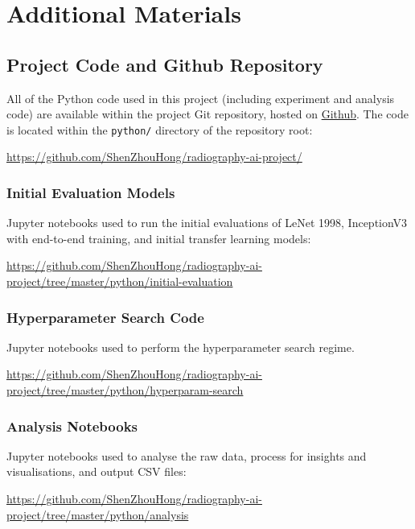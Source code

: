 \setlength{\headwidth}{\textwidth}

\chapter{Additional Materials}

\section{Project Code and Github Repository}

All of the Python code used in this project (including experiment and analysis code) are available within the project Git repository, hosted on \href{https://github.com/}{Github}. The code is located within the \texttt{python/} directory of the repository root:

\url{https://github.com/ShenZhouHong/radiography-ai-project/}

\subsection{Initial Evaluation Models}

Jupyter notebooks used to run the initial evaluations of LeNet 1998, InceptionV3 with end-to-end training, and initial transfer learning models:

\url{https://github.com/ShenZhouHong/radiography-ai-project/tree/master/python/initial-evaluation}

\subsection{Hyperparameter Search Code}

Jupyter notebooks used to perform the hyperparameter search regime.

\url{https://github.com/ShenZhouHong/radiography-ai-project/tree/master/python/hyperparam-search}

\subsection{Analysis Notebooks}

Jupyter notebooks used to analyse the raw data, process for insights and visualisations, and output CSV files:

\url{https://github.com/ShenZhouHong/radiography-ai-project/tree/master/python/analysis}